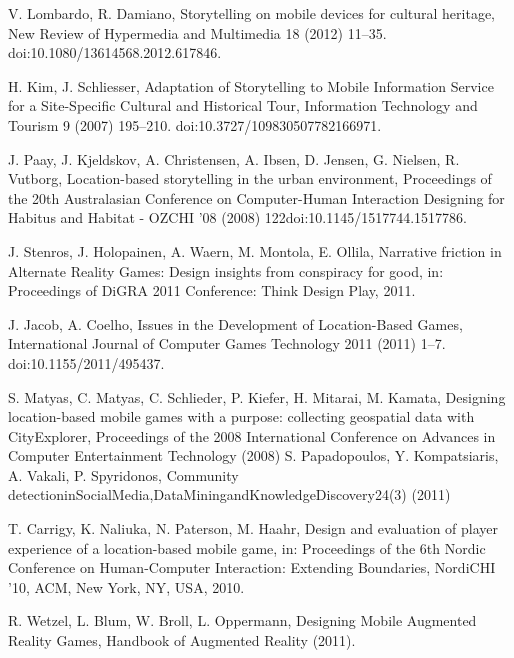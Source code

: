 \renewcommand{\bibname}{REFERENCES}
\cleardoublepage %
\begin{spacing}{1.5}
\begin{thebibliography}{99}

  V. Lombardo, R. Damiano, Storytelling on mobile devices for cultural heritage, New Review of Hypermedia and Multimedia 18 (2012) 11–35. doi:10.1080/13614568.2012.617846. 

 H. Kim, J. Schliesser, Adaptation of Storytelling to Mobile Information Service for a Site-Speciﬁc Cultural and Historical Tour, Information Technology and Tourism 9 (2007) 195–210. doi:10.3727/109830507782166971.

  J. Paay, J. Kjeldskov, A. Christensen, A. Ibsen, D. Jensen, G. Nielsen, R. Vutborg, Location-based storytelling in the urban environment, Proceedings of the 20th Australasian Conference on Computer-Human Interaction Designing for Habitus and Habitat - OZCHI ’08 (2008) 122doi:10.1145/1517744.1517786. 

  J. Stenros, J. Holopainen, A. Waern, M. Montola, E. Ollila, Narrative friction in Alternate Reality Games: Design insights from conspiracy for good, in: Proceedings of DiGRA 2011 Conference: Think Design Play, 2011.

 J. Jacob, A. Coelho, Issues in the Development of Location-Based Games, International Journal of Computer Games Technology 2011 (2011) 1–7. doi:10.1155/2011/495437.  

 S. Matyas, C. Matyas, C. Schlieder, P. Kiefer, H. Mitarai, M. Kamata, Designing location-based mobile games with a purpose: collecting geospatial data with CityExplorer, Proceedings of the 2008 International Conference on Advances in Computer Entertainment Technology (2008) 
  S. Papadopoulos, Y. Kompatsiaris, A. Vakali, P. Spyridonos, Community detectioninSocialMedia,DataMiningandKnowledgeDiscovery24(3) (2011) 

  T. Carrigy, K. Naliuka, N. Paterson, M. Haahr, Design and evaluation of player experience of a location-based mobile game, in: Proceedings of the 6th Nordic Conference on Human-Computer Interaction: Extending Boundaries, NordiCHI ’10, ACM, New York, NY, USA, 2010. 

  R. Wetzel, L. Blum, W. Broll, L. Oppermann, Designing Mobile Augmented Reality Games, Handbook of Augmented Reality (2011).


\end{thebibliography}
\end{spacing}
